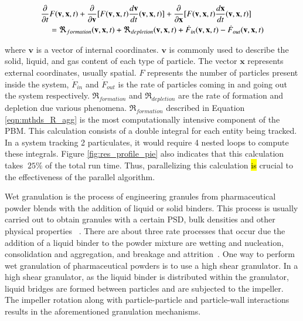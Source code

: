 \documentclass[review]{elsarticle}
\begin{document}
\begin{linenumbers}
\begin{align}
\frac{ \partial}{\partial t}&F(\textbf{v},\textbf{x},t) + \frac{\partial}{\partial 
\textbf{v}}[F(\textbf{v},\textbf{x},t)\frac{d\textbf{v}}{dt}(\textbf{v},\textbf{x},t)] 
+ \frac{\partial}{\partial \textbf{x}}[F(\textbf{v},\textbf{x},t)\frac{d\textbf{x}}{dt}
(\textbf{v},\textbf{x},t)] \notag\\
    &= 
\Re_{formation}(\textbf{v},\textbf{x},t)+\Re_{depletion}(\textbf{v},\textbf{x},t)
+\dot{F}_{in}(\textbf{v},\textbf{x},t) -\dot{F}_{out}(\textbf{v},\textbf{x},t) 
\label{eqn:bkgd_pbm_general} 
\end{align}

where $\textbf{v}$ is a vector of internal 
coordinates.  $\textbf{v}$ is commonly used to describe the solid, liquid, 
and gas content of each type of particle. The vector $\textbf{x}$ represents 
external coordinates, usually spatial. $F$ represents the 
number of particles present inside the system, $\dot{F}_{in}$ 
and $\dot{F}_{out}$ is the rate of particles coming in and going out the 
system respectively. $\Re_{formation}$ and $\Re_{depletion}$ are the rate of 
formation and depletion due various phenomena. $\Re_{formation}$ described in Equation 
\ref{eqn:mthds_R_agg} is the most computationally intensive component of the PBM.
This calculation consists of a double integral for each entity being tracked. In a 
system tracking 2 particulates, it would require 4 nested loops to compute these 
integrals. Figure \ref{fig:res_profile_pie} also indicates that this calculation 
takes $~25\%$ of the total run time. Thus, parallelizing this calculation \hl{is} crucial 
to the effectiveness of the parallel algorithm.

Wet granulation is the process of engineering granules from pharmaceutical powder blends 
with the addition of liquid or solid binders. This process is usually carried out 
to obtain granules with a certain PSD,  bulk densities and other physical properties
~\citep{Barrasso2015cerd}. There are about three rate processes that occur due the addition 
of a liquid binder to the powder mixture are wetting and nucleation, consolidation and 
aggregation, and breakage and attrition~\citep{sen2014}. One way to perform wet
granulation of pharmaceutical powders is to use a high shear granulator. 
In a high shear granulator, as the liquid binder is distributed within the granulator, 
liquid bridges are formed between particles and are subjected to the impeller. 
The impeller rotation along with particle-particle and particle-wall interactions 
results in the aforementioned granulation mechanisms.



\end{linenumbers}
\end{document}
